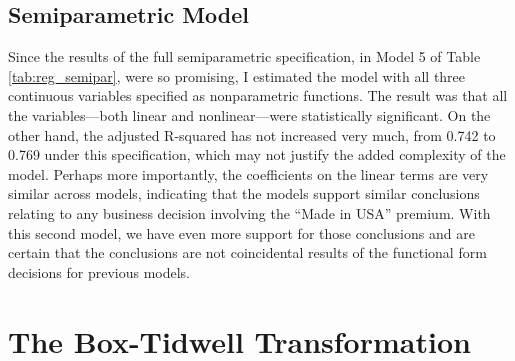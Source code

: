 \documentclass[11pt]{paper}
\begin{document}
\pagebreak
\subsection{Semiparametric Model}


Since the results of the full semiparametric specification,
in Model 5 of Table \ref{tab:reg_semipar},
were so promising, 
I estimated the model with all three continuous variables specified as nonparametric functions. 
The result was that 
all the variables---both linear and nonlinear---were 
statistically significant. 
On the other hand, 
the adjusted R-squared has not increased very much, 
from 0.742 to 0.769 under this specification, 
which may not justify the added complexity of the model.
Perhaps more importantly, the coefficients on the 
linear terms are very similar across models, 
indicating that the models support similar conclusions relating to any business decision involving
the ``Made in USA'' premium. 
With this second model, we have even more support for those conclusions
and are certain that the conclusions are not 
coincidental results of the
functional form decisions for previous models.


 

\pagebreak
\section{The Box-Tidwell Transformation}






\end{document}
